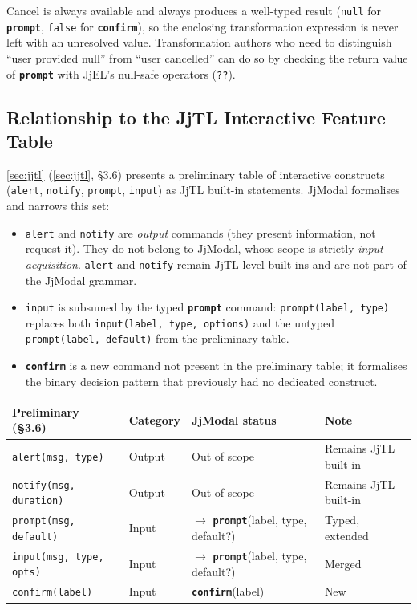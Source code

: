 \documentclass[11pt,a4paper]{article}
\newcommand{\jjmodal}{\textsf{JjModal}}
\newcommand{\jjel}{\textsf{JjEL}}
\newcommand{\jjtl}{\textsf{JjTL}}
\newcommand{\kw}[1]{\texttt{\textbf{#1}}}
\begin{document}
Cancel is always available and always produces a well-typed result
(\texttt{null} for \kw{prompt}, \texttt{false} for \kw{confirm}), so the
enclosing transformation expression is never left with an unresolved
value. Transformation authors who need to distinguish ``user provided
null'' from ``user cancelled'' can do so by checking the return value of
\kw{prompt} with \jjel{}'s null-safe operators (\texttt{??}).
 
\subsection{Relationship to the \jjtl{} Interactive Feature Table}
 
\cref{sec:jjtl} (\cref*{sec:jjtl}, §3.6) presents a preliminary table of
interactive constructs (\texttt{alert}, \texttt{notify}, \texttt{prompt},
\texttt{input}) as \jjtl{} built-in statements. \jjmodal{} formalises and
narrows this set:
 
\begin{itemize}
    \item \texttt{alert} and \texttt{notify} are \emph{output} commands
          (they present information, not request it). They do not belong
          to \jjmodal{}, whose scope is strictly \emph{input
          acquisition}. \texttt{alert} and \texttt{notify} remain
          \jjtl{}-level built-ins and are not part of the \jjmodal{}
          grammar.
    \item \texttt{input} is subsumed by the typed \kw{prompt} command:
          \texttt{prompt(label, type)} replaces both
          \texttt{input(label, type, options)} and the untyped
          \texttt{prompt(label, default)} from the preliminary table.
    \item \kw{confirm} is a new command not present in the preliminary
          table; it formalises the binary decision pattern that
          previously had no dedicated construct.
\end{itemize}
 
\begin{center}
\small
\begin{tabular}{@{}llll@{}}
\toprule
\textbf{Preliminary (§3.6)} & \textbf{Category} & \textbf{JjModal status} & \textbf{Note} \\
\midrule
\texttt{alert(msg, type)}       & Output & Out of scope & Remains \jjtl{} built-in \\
\texttt{notify(msg, duration)}  & Output & Out of scope & Remains \jjtl{} built-in \\
\texttt{prompt(msg, default)}   & Input  & $\to$ \kw{prompt}(label, type, default?) & Typed, extended \\
\texttt{input(msg, type, opts)} & Input  & $\to$ \kw{prompt}(label, type, default?) & Merged \\
\texttt{confirm(label)}         & Input  & \kw{confirm}(label) & New \\
\bottomrule
\end{tabular}
\end{center}
 
\end{document}
